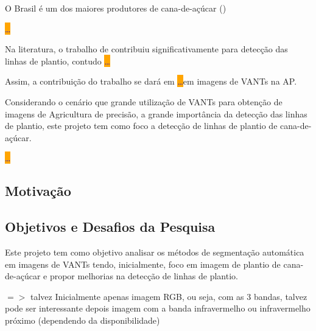 \documentclass[12pt, a4paper, english, brazil]{article}
\newcommand{\textRed}[1]{{{\color{red} #1}}}
\newcommand{\dotsBlue}{\colorbox{orange}{\textcolor{blue}{\dots}}}
\begin{document}
O Brasil é um dos maiores produtores de cana-de-açúcar (\cite{Ritchie_2020}) 


\dotsBlue

Na literatura, o trabalho de \cite{Silva_Escarpinati_Backes_2021} contribuiu significativamente para detecção das linhas de plantio, contudo \dotsBlue

Assim, a contribuição do trabalho se dará em
\dotsBlue em imagens de VANTs na AP.


Considerando o cenário que grande utilização de VANTs para obtenção de imagens de Agricultura de precisão, a grande importância da detecção das linhas de plantio, este projeto tem como foco a detecção de linhas de plantio de cana-de-açúcar.

\dotsBlue

\subsection{Motivação}
 
\subsection{Objetivos e Desafios da Pesquisa}

Este projeto tem como objetivo analisar os métodos de segmentação automática em imagens de VANTs tendo, inicialmente, foco em imagem de plantio de cana-de-açúcar e propor melhorias na detecção de linhas de plantio. 

$=>$ \textRed{talvez} Inicialmente apenas imagem RGB, ou seja, com as 3 bandas, talvez pode ser interessante depois imagem com a banda infravermelho ou infravermelho próximo (dependendo da disponibilidade)
\end{document}
